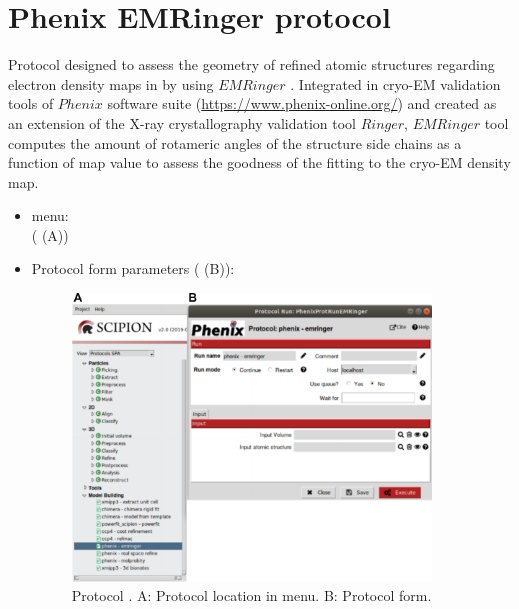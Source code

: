 \section{Phenix EMRinger protocol}
\label{app:emRingerProtocol}%
Protocol designed to assess the geometry of refined atomic structures regarding electron density maps in \scipion by using $EMRinger$ \citep{barad2015}. Integrated in cryo-EM validation tools of $Phenix$ software suite (\url{https://www.phenix-online.org/}) and created as an extension of the X-ray crystallography validation tool $Ringer$, $EMRinger$ tool computes the amount of rotameric angles of the structure side chains as a function of map value to assess the goodness of the fitting to the cryo-EM density map.\\

\begin{itemize}
 \item \scipion menu:\\
   ( (A))\\
  
 \item Protocol form parameters ( (B)):\\
  
    \begin{figure}[H]
     \centering 
     \captionsetup{width=.7\linewidth} 
     \includegraphics[width=0.90\textwidth]{Images_appendix/Fig139.pdf}
     \caption{Protocol . A: Protocol location in \scipion menu. B: Protocol form.}
     \label{fig:app_protocol_emringer_1}
    \end{figure}


\end{itemize}
